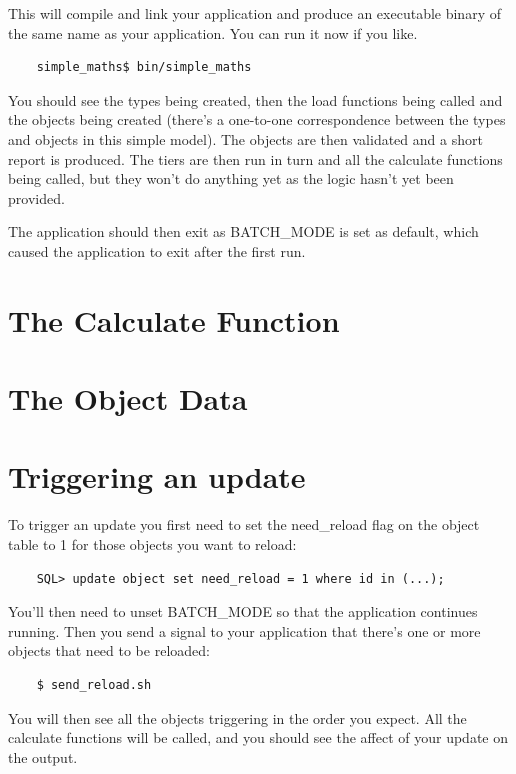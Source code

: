 \documentclass{report}
\begin{document}
This will compile and link your application and produce an executable binary of the same name as your 
application. You can run it now if you like. 

\begin{verbatim}
    simple_maths$ bin/simple_maths
\end{verbatim}

You should see the types being created, then the load functions being called and the objects being created (there's a one-to-one correspondence between the types and objects in this simple model). The objects are then validated and a short report is produced. The tiers are then run in turn and all the calculate functions being called, but they won't do anything yet as the logic hasn't yet been provided.

The application should then exit as BATCH_MODE is set as default, which caused the application to exit after the first run.

\section{The Calculate Function}

\section{The Object Data}

\section{Triggering an update}

To trigger an update you first need to set the need_reload flag on the object table to 1 for those objects you want to reload:

\begin{verbatim}
    SQL> update object set need_reload = 1 where id in (...);
\end{verbatim}

You'll then need to unset BATCH_MODE so that the application continues running. Then you send a signal to your application that there's one or more objects that need to be reloaded:

\begin{verbatim}
    $ send_reload.sh 
\end{verbatim}

You will then see all the objects triggering in the order you expect. All the calculate functions will be called, and you should see the affect of your update on the output.
\end{document}
